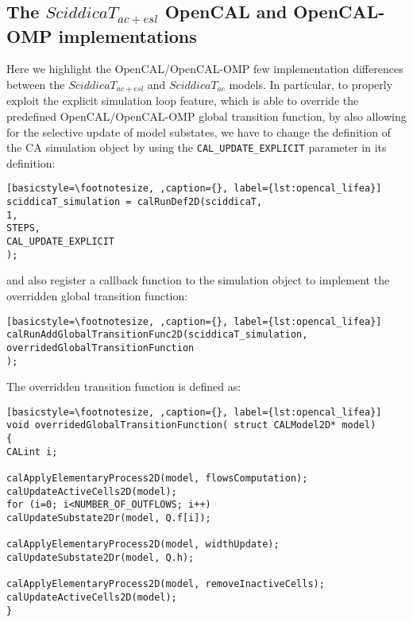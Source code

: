 \subsection{The $SciddicaT_{ac+esl}$ OpenCAL and OpenCAL-OMP implementations}
Here we highlight the OpenCAL/OpenCAL-OMP few implementation
differences between the $SciddicaT_{ac+esl}$ and $SciddicaT_{ac}$
models. In particular, to properly exploit the explicit simulation
loop feature, which is able to override the predefined
OpenCAL/OpenCAL-OMP global transition function, by also allowing
for the selective update of model substates, we have to change the
definition of the CA simulation object by using the
\verb'CAL_UPDATE_EXPLICIT' parameter in its definition:
\begin{lstlisting}[basicstyle=\footnotesize, ,caption={}, label={lst:opencal_lifea}]
sciddicaT_simulation = calRunDef2D(sciddicaT,
1,
STEPS,
CAL_UPDATE_EXPLICIT
);
\end{lstlisting}

\noindent and also register a callback function to the simulation object to
implement the overridden global transition function:

\begin{lstlisting}[basicstyle=\footnotesize, ,caption={}, label={lst:opencal_lifea}]
calRunAddGlobalTransitionFunc2D(sciddicaT_simulation,
overridedGlobalTransitionFunction
);
\end{lstlisting}

\noindent The overridden transition function is defined as:
\begin{lstlisting}[basicstyle=\footnotesize, ,caption={}, label={lst:opencal_lifea}]
void overridedGlobalTransitionFunction( struct CALModel2D* model)
{
CALint i;

calApplyElementaryProcess2D(model, flowsComputation);
calUpdateActiveCells2D(model);
for (i=0; i<NUMBER_OF_OUTFLOWS; i++)
calUpdateSubstate2Dr(model, Q.f[i]);

calApplyElementaryProcess2D(model, widthUpdate);
calUpdateSubstate2Dr(model, Q.h);

calApplyElementaryProcess2D(model, removeInactiveCells);
calUpdateActiveCells2D(model);
}
\end{lstlisting}

